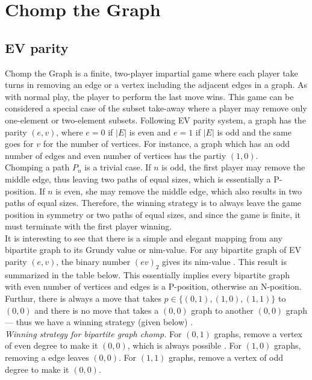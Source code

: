 \documentclass[a4paper, 12pt]{article}
\theoremstyle{remark} %
\begin{document}
\section{Chomp the Graph}
\label{chompthegraph}

\subsection{EV parity}

Chomp the Graph is a finite, two-player impartial game where each player take turns in removing an edge or a vertex including the adjacent edges in a graph. As with normal play, the player to perform the last move wins. This game can be considered a special case of the subset take-away where a player may remove only one-element or two-element subsets. Following EV parity system,  a graph has the parity $(e,v)$, where $e=0$ if $|E|$ is even and $e=1$ if $|E|$ is odd and the same goes for $v$ for the number of vertices. For instance, a graph which has an odd number of edges and even number of vertices has the partiy $(1,0)$.\\

Chomping a path $P_n$ is a trivial case. If $n$ is odd, the first player may remove the middle edge, thus leaving two paths of equal sizes, which is essentially a P-position. If $n$ is even, she may remove the middle edge, which also results in two paths of equal sizes. Therefore, the winning strategy is to always leave the game position in symmetry or two paths of equal sizes, and since the game is finite, it must terminate with the first player winning.\\

It is interesting to see that there is a simple and elegant mapping from any bipartite graph to its Grundy value or nim-value. For any bipartite graph of EV parity $(e,v)$, the binary number $(ev)_2$ gives its nim-value \cite{broadScientific}. This result is summarized in the table below. This essentially implies every bipartite graph with even number of vertices and edges is a P-position, otherwise an N-position. Furthur, there is always a move that takes $p \in \{(0,1),(1,0),(1,1)\}$ to $(0,0)$ and there is no move that takes a $(0,0)$ graph to another $(0,0)$ graph --- thus we have a winning strategy (given below) \cite{broadScientific}. \\

\noindent\textit{Winning strategy for bipartite graph chomp.} For $(0,1)$ graphs, remove a vertex of even degree to make it $(0,0)$, which is always possible \cite{broadScientific}. For $(1,0)$ graphs, removing a edge leaves $(0,0)$. For $(1,1)$ graphs, remove a vertex of odd degree to make it $(0,0)$.
\end{document}
